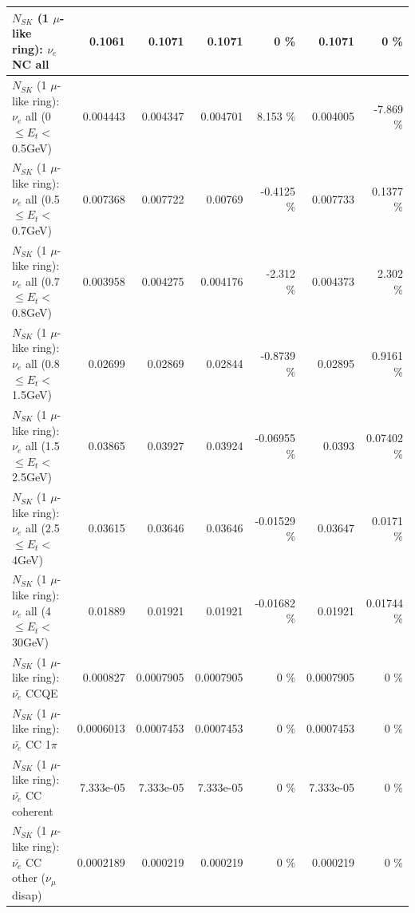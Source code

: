 \begin{table}
\begin{tabular}{| l | r | r | r  r | r  r |}
                                  $N_{SK}$ (1 $\mu$-like ring): $\nu_{e}$ NC all &          0.1061 &          0.1071 &          0.1071 &        0 \%  &          0.1071 &        0 \%  \\ 
\hline
           $N_{SK}$ (1 $\mu$-like ring): $\nu_{e}$ all (0 $\leq E_{t} <$ 0.5GeV) &        0.004443 &        0.004347 &        0.004701 &    8.153 \%  &        0.004005 &   -7.869 \%  \\ 
         $N_{SK}$ (1 $\mu$-like ring): $\nu_{e}$ all (0.5 $\leq E_{t} <$ 0.7GeV) &        0.007368 &        0.007722 &         0.00769 &  -0.4125 \%  &        0.007733 &   0.1377 \%  \\ 
         $N_{SK}$ (1 $\mu$-like ring): $\nu_{e}$ all (0.7 $\leq E_{t} <$ 0.8GeV) &        0.003958 &        0.004275 &        0.004176 &   -2.312 \%  &        0.004373 &    2.302 \%  \\ 
         $N_{SK}$ (1 $\mu$-like ring): $\nu_{e}$ all (0.8 $\leq E_{t} <$ 1.5GeV) &         0.02699 &         0.02869 &         0.02844 &  -0.8739 \%  &         0.02895 &   0.9161 \%  \\ 
         $N_{SK}$ (1 $\mu$-like ring): $\nu_{e}$ all (1.5 $\leq E_{t} <$ 2.5GeV) &         0.03865 &         0.03927 &         0.03924 & -0.06955 \%  &          0.0393 &  0.07402 \%  \\ 
           $N_{SK}$ (1 $\mu$-like ring): $\nu_{e}$ all (2.5 $\leq E_{t} <$ 4GeV) &         0.03615 &         0.03646 &         0.03646 & -0.01529 \%  &         0.03647 &   0.0171 \%  \\ 
            $N_{SK}$ (1 $\mu$-like ring): $\nu_{e}$ all (4 $\leq E_{t} <$ 30GeV) &         0.01889 &         0.01921 &         0.01921 & -0.01682 \%  &         0.01921 &  0.01744 \%  \\ 
\hline
\hline
\hline
                                $N_{SK}$ (1 $\mu$-like ring): $\bar{\nu_e}$ CCQE &        0.000827 &       0.0007905 &       0.0007905 &        0 \%  &       0.0007905 &        0 \%  \\ 
                           $N_{SK}$ (1 $\mu$-like ring): $\bar{\nu_e}$ CC 1$\pi$ &       0.0006013 &       0.0007453 &       0.0007453 &        0 \%  &       0.0007453 &        0 \%  \\ 
                         $N_{SK}$ (1 $\mu$-like ring): $\bar{\nu_e}$ CC coherent &       7.333e-05 &       7.333e-05 &       7.333e-05 &        0 \%  &       7.333e-05 &        0 \%  \\ 
          $N_{SK}$ (1 $\mu$-like ring): $\bar{\nu_e}$ CC other ($\nu_\mu$ disap) &       0.0002189 &        0.000219 &        0.000219 &        0 \%  &        0.000219 &        0 \%  \\ 

\end{tabular}
\end{table}
